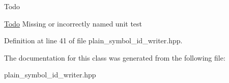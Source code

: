 \begin{DoxyRefDesc}{Todo}
\item[\hyperlink{todo__todo000037}{Todo}]Missing or incorrectly named unit test\end{DoxyRefDesc}


Definition at line 41 of file plain\-\_\-symbol\-\_\-id\-\_\-writer.\-hpp.



The documentation for this class was generated from the following file\-:\begin{DoxyCompactItemize}
\item 
plain\-\_\-symbol\-\_\-id\-\_\-writer.\-hpp\end{DoxyCompactItemize}
